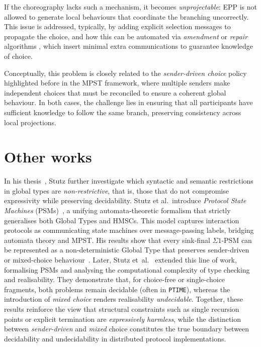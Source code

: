 If the choreography lacks such a mechanism, it becomes 
\emph{unprojectable}: EPP is not allowed to generate local behaviours 
that coordinate the branching uncorrectly. This issue 
is addressed, typically, by adding explicit selection messages to 
propagate the choice, and how this can be automated via 
\emph{amendment} or \emph{repair} algorithms 
\cite{DBLP:journals/corr/LaneseMZ13, basu2016automated}, 
which insert minimal extra 
communications to guarantee knowledge of choice.  

Conceptually, this problem is closely related to the \emph{sender-driven 
choice} policy highlighted before in the MPST framework, where 
multiple senders make independent choices that must be reconciled to 
ensure a coherent global behaviour. In both cases, the challenge lies 
in ensuring that all participants have sufficient knowledge to follow 
the same branch, preserving consistency across local projections. 


\section{Other works}
In his thesis~\cite{stutz2024implementability}, 
Stutz further investigate which syntactic and semantic
restrictions in global types are \emph{non-restrictive}, that is, those that
do not compromise expressivity while preserving decidability.  
Stutz et al.~introduce
\emph{Protocol State Machines} (PSMs)~\cite{stutz2025automata}, 
a unifying automata-theoretic
formalism that strictly generalises both Global Types and HMSCs.  
This model captures interaction protocols as communicating state
machines over message-passing labels, bridging automata theory and MPST.
His results show that every sink-final $\Sigma 1$-PSM can be represented
as a non-deterministic Global Type that preserves sender-driven or
mixed-choice behaviour~\cite[Thm.~8.14]{stutz2024implementability}.  
Later, Stutz et~al.~\cite{stutz2025automata} extended this line of work,
formalising PSMs and analysing the computational complexity of type
checking and realisability. They demonstrate that, for choice-free or
single-choice fragments, both problems remain decidable (often in
\verb|PTIME|), whereas the introduction of \emph{mixed choice} renders
realisability \emph{undecidable}.  
Together, these results reinforce the view that structural constraints
such as single recursion points or explicit termination are
\emph{expressively harmless}, while the distinction between
\emph{sender-driven} and \emph{mixed} choice constitutes the true
boundary between decidability and undecidability in distributed protocol
implementations.

